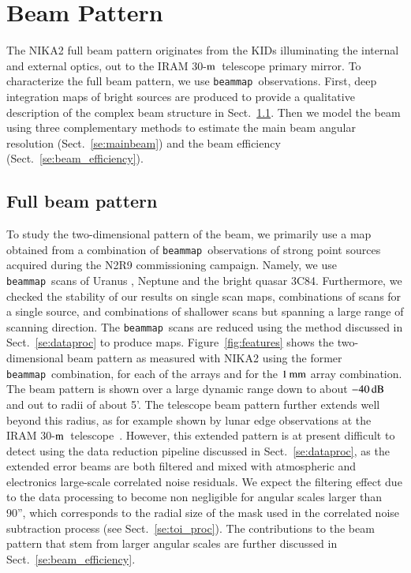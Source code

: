 \documentclass[traditionalabstract]{aa}
\newcommand{\bm}{{\tt beammap}}
\newcommand{\trentemetre}{30-$\rm{m}$}
\newcommand{\lp}[1]{#1}
\newcommand{\rev}[1]{#1}
\begin{document}
\section{Beam Pattern}
\label{se:beam}
%

{\lp The NIKA2 full beam pattern originates from the KIDs illuminating the internal
and external optics, out to the IRAM \trentemetre\ telescope primary mirror.}
To characterize the full beam pattern, we use \bm\ observations. First,
deep integration maps of bright sources are produced to provide a
qualitative description of the complex beam structure in
Sect.~\ref{se:fullbeam}. Then we model the beam using three
complementary methods to estimate the main beam angular resolution
(Sect.~\ref{se:mainbeam}) and the beam efficiency
(Sect.~\ref{se:beam_efficiency}).

\subsection{Full beam pattern}
\label{se:fullbeam}

To study the two-dimensional pattern of the beam, we 
primarily use a map obtained from a combination of \bm\ observations
of strong point sources acquired during the N2R9 commissioning campaign.
Namely, we use \bm\ scans of Uranus%
,  Neptune %
and the bright quasar 3C84. %
Furthermore, we checked the stability of our results on single scan
maps, combinations of scans for a single source, and combinations of
shallower scans but spanning a large range of scanning direction. {\lp
The \bm\ scans are reduced using the method discussed in
Sect.~\ref{se:dataproc} to produce maps.}
{\lp Figure~\ref{fig:features} shows the two-dimensional beam pattern
as measured with NIKA2 using the former \bm\ combination, for each of
the arrays and for the $1\,\rm{mm}$ array combination.}
{\lp The beam pattern is shown over a large dynamic range down
to about $-40\,\rm{dB}$ and out to radii of about 5’.
The telescope beam pattern further extends well beyond this radius, as for
example shown by lunar edge observations
at the IRAM \trentemetre\ telescope~\citep{Greve1998,
Kramer2013}. However,
this extended pattern is at present difficult to detect using the data
reduction pipeline discussed in Sect.~\ref{se:dataproc}, as
the extended error beams are both filtered and mixed with 
atmospheric and electronics large-scale correlated noise
residuals. {\rev We expect the filtering effect due to the data
processing to become non negligible for angular scales larger than
90'', which corresponds to the radial size of the mask used in the
correlated noise subtraction process (see Sect.~\ref{se:toi_proc}).}
The contributions to the beam pattern that stem from larger angular scales are
further discussed in Sect.~\ref{se:beam_efficiency}.} 
\end{document}
